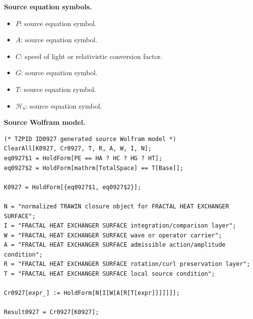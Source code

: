 \begin{minipage}[t]{0.49\linewidth}
\begingroup
\small
\raggedright
\textbf{Source equation symbols.}\par
\begin{itemize}[leftmargin=1.35em,itemsep=1pt,topsep=1pt,parsep=0pt]
    \item $P$: source equation symbol.
    \item $A$: source equation symbol.
    \item $C$: speed of light or relativistic conversion factor.
    \item $G$: source equation symbol.
    \item $T$: source equation symbol.
    \item $\mathcal{H}_b$: source equation symbol.
\end{itemize}
\endgroup
\end{minipage}\hfill
\begin{minipage}[t]{0.47\linewidth}
\begingroup
\scriptsize
\raggedright
\textbf{Source Wolfram model.}\par
\begin{Verbatim}[fontsize=\tiny,breaklines=true,breakanywhere=true]
(* TZPID ID0927 generated source Wolfram model *)
ClearAll[K0927, Cr0927, T, R, A, W, I, N];
eq0927$1 = HoldForm[PE == HA ? HC ? HG ? HT];
eq0927$2 = HoldForm[mathrm[TotalSpace] == T[Base]];

K0927 = HoldForm[{eq0927$1, eq0927$2}];

N = "normalized TRAWIN closure object for FRACTAL HEAT EXCHANGER SURFACE";
I = "FRACTAL HEAT EXCHANGER SURFACE integration/comparison layer";
W = "FRACTAL HEAT EXCHANGER SURFACE wave or operator carrier";
A = "FRACTAL HEAT EXCHANGER SURFACE admissible action/amplitude condition";
R = "FRACTAL HEAT EXCHANGER SURFACE rotation/curl preservation layer";
T = "FRACTAL HEAT EXCHANGER SURFACE local source condition";

Cr0927[expr_] := HoldForm[N[I[W[A[R[T[expr]]]]]]];

Result0927 = Cr0927[K0927];
\end{Verbatim}
\endgroup
\end{minipage}

